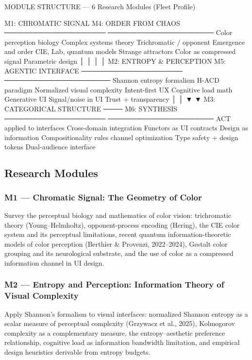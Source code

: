 \documentclass[11pt,letterpaper]{article}
\begin{document}
\begin{asciibox}
MODULE STRUCTURE — 6 Research Modules (Fleet Profile)

  M1: CHROMATIC SIGNAL          M4: ORDER FROM CHAOS
  ─────────────────────         ──────────────────────
  Color perception biology      Complex systems theory
  Trichromatic / opponent       Emergence and order
  CIE, Lab, quantum models      Strange attractors
  Color as compressed signal    Parametric design
          │                              │
          │                              │
  M2: ENTROPY & PERCEPTION      M5: AGENTIC INTERFACE
  ─────────────────────         ──────────────────────
  Shannon entropy formalism     H-ACD paradigm
  Normalized visual complexity  Intent-first UX
  Cognitive load math           Generative UI
  Signal/noise in UI            Trust + transparency
          │                              │
          ▼                              ▼
  M3: CATEGORICAL STRUCTURE ──── M6: SYNTHESIS
  ─────────────────────          ──────────────────────
  ACT applied to interfaces      Cross-domain integration
  Functors as UI contracts       Design as information
  Compositionality rules         channel optimization
  Type safety + design tokens    Dual-audience interface
\end{asciibox}

\subsection{Research Modules}

\subsubsection{M1 — Chromatic Signal: The Geometry of Color}
Survey the perceptual biology and mathematics of color vision: trichromatic theory (Young--Helmholtz), opponent-process encoding (Hering), the CIE color system and its perceptual limitations, recent quantum information-theoretic models of color perception (Berthier \& Provenzi, 2022--2024), Gestalt color grouping and its neurological substrate, and the use of color as a compressed information channel in UI design.

\subsubsection{M2 — Entropy and Perception: Information Theory of Visual Complexity}
Apply Shannon's formalism to visual interfaces: normalized Shannon entropy as a scalar measure of perceptual complexity (Grzywacz et al., 2025), Kolmogorov complexity as a complementary measure, the entropy--aesthetic preference relationship, cognitive load as information bandwidth limitation, and empirical design heuristics derivable from entropy budgets.
\end{document}
